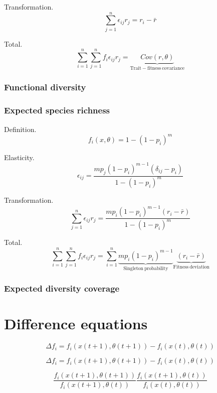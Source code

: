 \documentclass{article}
\begin{document}
Transformation.
\begin{equation}
\sum_{j = 1}^n \epsilon_{ij} r_j = r_i - \bar{r}
\end{equation}

Total.
\begin{equation}
\sum_{i = 1}^n\sum_{j = 1}^nf_i\epsilon_{ij}r_j = 
\underbrace{Cov(r, \theta)}_{\mathrm{Trait-fitness\ covariance}}
\end{equation}

\subsubsection{Functional diversity}

\subsubsection{Expected species richness}

Definition.
\begin{equation}
f_i(x, \theta) = 1 - (1 - p_i)^m
\end{equation}

Elasticity.
\begin{equation}
\epsilon_{ij} = 
\frac{mp_j\left(1 - p_i\right)^{m-1}\left(\delta_{ij} - p_i\right)}{1 - \left(1 - p_i\right)^m}
\end{equation}

Transformation.
\begin{equation}
\sum_{j = 1}^n \epsilon_{ij} r_j = 
\frac{mp_i(1 - p_i)^{m-1}\left(r_i - \bar{r}\right)}{1 - (1 - p_i)^m}
\end{equation}

Total.
\begin{equation}
\sum_{i = 1}^n\sum_{j = 1}^nf_i\epsilon_{ij}r_j = 
\sum_{i = 1}^n
\underbrace{mp_i(1 - p_i)^{m-1}}_{\mathrm{Singleton\ probability}}
\underbrace{\left(r_i - \bar{r}\right)}_{\mathrm{Fitness\ deviation}}
\end{equation}

\subsubsection{Expected diversity coverage}

\section{Difference equations}

\begin{equation}
\Delta f_i = 
f_i(x(t+1), \theta(t+1)) - 
f_i(x(t), \theta(t))
\end{equation}

\begin{equation}
\Delta f_i = 
f_i(x(t+1), \theta(t+1)) - 
f_i(x(t), \theta(t))
\end{equation}

\begin{equation}
\frac{f_i(x(t+1), \theta(t+1))}{f_i(x(t+1), \theta(t))}
\frac{f_i(x(t+1), \theta(t))}{f_i(x(t), \theta(t))}
\end{equation}
\end{document}
